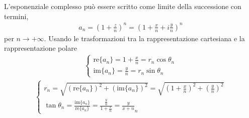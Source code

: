 \documentclass[letterpaper,10pt,italian]{jupyterBook}
\begin{document}
\sphinxAtStartPar
L’esponenziale complesso può essere scritto come limite della successione con termini,
\begin{equation*}
\begin{split}a_n = \left( 1 + \frac{z}{n} \right)^n = \left( 1 + \frac{x}{n} + i \frac{y}{n} \right)^n\end{split}
\end{equation*}
\sphinxAtStartPar
per \(n \rightarrow +\infty\). Usando le trasformazioni tra la rappresentazione cartesiana e la rappresentazione polare
\begin{equation*}
\begin{split}\begin{cases}
  \text{re}\{a_n\} = 1 + \frac{x}{n} = r_n \cos \theta_n \\
  \text{im}\{a_n\} = \frac{y}{n} = r_n \sin \theta_n
\end{cases}\end{split}
\end{equation*}\begin{equation*}
\begin{split}\begin{cases}
  r_n = \sqrt{ \left(\text{re}\{a_n\}\right)^2 + \left(\text{im}\{a_n\}\right)^2 } =  \sqrt{\left(1+ \frac{x}{n}\right)^2 + \left(\frac{y}{n}\right)^2} \\
  \tan \theta_n = \frac{\text{im}\{a_n\}}{\text{re}\{a_n\}} = \frac{\frac{y}{n}}{1 + \frac{x}{n}} = \frac{y}{x + n}_n
\end{cases}\end{split}
\end{equation*}
\end{document}
